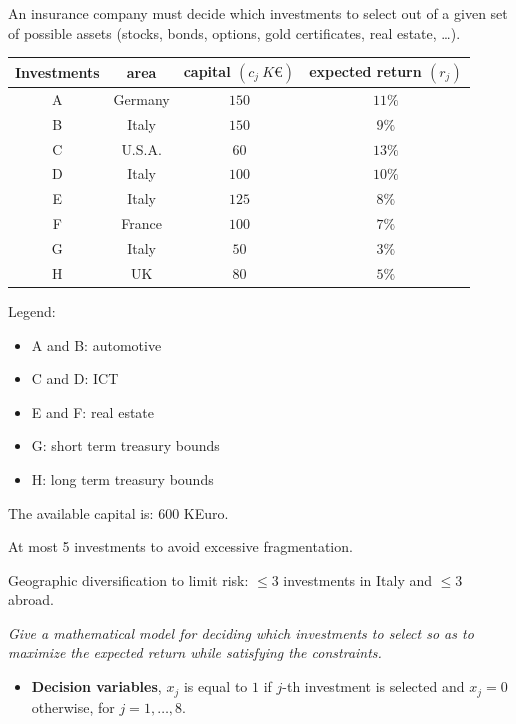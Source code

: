 \begin{examplebox}
    An insurance company must decide which investments to select out of a given set of possible assets (stocks, bonds, options, gold certificates, real estate, \dots).

    \begin{center}
        \begin{tabular}{@{} c | c c c @{}}
            Investments & area & capital $\left(c_{j} \: K€\right)$ & expected return $\left(r_{j}\right)$ \\
            \midrule
            A & Germany & $150$ & $11\%$ \\
            B & Italy & $150$ & $9\%$ \\
            C & U.S.A. & $60$ & $13\%$ \\
            D & Italy & $100$ & $10\%$ \\
            E & Italy & $125$ & $8\%$ \\
            F & France & $100$ & $7\%$ \\
            G & Italy & $50$ & $3\%$ \\
            H & UK & $80$ & $5\%$
        \end{tabular}
    \end{center}
    Legend:
    \begin{itemize}
        \item A and B: automotive
        \item C and D: ICT
        \item E and F: real estate
        \item G: short term treasury bounds
        \item H: long term treasury bounds
    \end{itemize}
    The available capital is: $600$ KEuro.

    At most 5 investments to avoid excessive fragmentation.

    Geographic diversification to limit risk: $\le 3$ investments in Italy and $\le 3$ abroad.

    \emph{Give a mathematical model for deciding which investments to select so as to maximize the expected return while satisfying the constraints.}

    \begin{itemize}
        \item \textbf{Decision variables}, $x_{j}$ is equal to $1$ if $j$-th investment is selected and $x_{j}=0$ otherwise, for $j = 1, \dots, 8$.
        

\end{itemize}
\end{examplebox}
